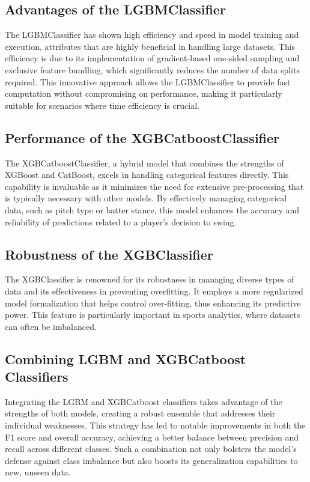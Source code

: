 \documentclass[12pt]{article}
\begin{document}
\subsection*{Advantages of the LGBMClassifier}
The LGBMClassifier has shown high efficiency and speed in model training and execution, attributes that are highly beneficial in handling large datasets. This efficiency is due to its implementation of gradient-based one-sided sampling and exclusive feature bundling, which significantly reduces the number of data splits required. This innovative approach allows the LGBMClassifier to provide fast computation without compromising on performance, making it particularly suitable for scenarios where time efficiency is crucial.

\subsection*{Performance of the XGBCatboostClassifier}
The XGBCatboostClassifier, a hybrid model that combines the strengths of XGBoost and CatBoost, excels in handling categorical features directly. This capability is invaluable as it minimizes the need for extensive pre-processing that is typically necessary with other models. By effectively managing categorical data, such as pitch type or batter stance, this model enhances the accuracy and reliability of predictions related to a player’s decision to swing.

\subsection*{Robustness of the XGBClassifier}
The XGBClassifier is renowned for its robustness in managing diverse types of data and its effectiveness in preventing overfitting. It employs a more regularized model formalization that helps control over-fitting, thus enhancing its predictive power. This feature is particularly important in sports analytics, where datasets can often be imbalanced.

\subsection*{Combining LGBM and XGBCatboost Classifiers}
Integrating the LGBM and XGBCatboost classifiers takes advantage of the strengths of both models, creating a robust ensemble that addresses their individual weaknesses. This strategy has led to notable improvements in both the F1 score and overall accuracy, achieving a better balance between precision and recall across different classes. Such a combination not only bolsters the model's defense against class imbalance but also boosts its generalization capabilities to new, unseen data.
\end{document}
